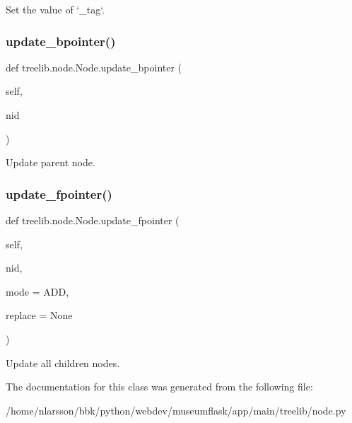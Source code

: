 \begin{DoxyVerb}Set the value of `_tag`.\end{DoxyVerb}
 \mbox{\label{classtreelib_1_1node_1_1Node_a7901e3be6d17854d393a389661287826}} 
\subsubsection{\texorpdfstring{update\+\_\+bpointer()}{update\_bpointer()}}
{\footnotesize\ttfamily def treelib.\+node.\+Node.\+update\+\_\+bpointer (\begin{DoxyParamCaption}\item[{}]{self,  }\item[{}]{nid }\end{DoxyParamCaption})}

\begin{DoxyVerb}Update parent node.\end{DoxyVerb}
 \mbox{\label{classtreelib_1_1node_1_1Node_a825ebfd2390ea553a95d0fa6985087d3}} 
\subsubsection{\texorpdfstring{update\+\_\+fpointer()}{update\_fpointer()}}
{\footnotesize\ttfamily def treelib.\+node.\+Node.\+update\+\_\+fpointer (\begin{DoxyParamCaption}\item[{}]{self,  }\item[{}]{nid,  }\item[{}]{mode = {\ttfamily ADD},  }\item[{}]{replace = {\ttfamily None} }\end{DoxyParamCaption})}

\begin{DoxyVerb}Update all children nodes.\end{DoxyVerb}
 

The documentation for this class was generated from the following file\+:\begin{DoxyCompactItemize}
\item 
/home/nlarsson/bbk/python/webdev/museumflask/app/main/treelib/node.\+py\end{DoxyCompactItemize}
